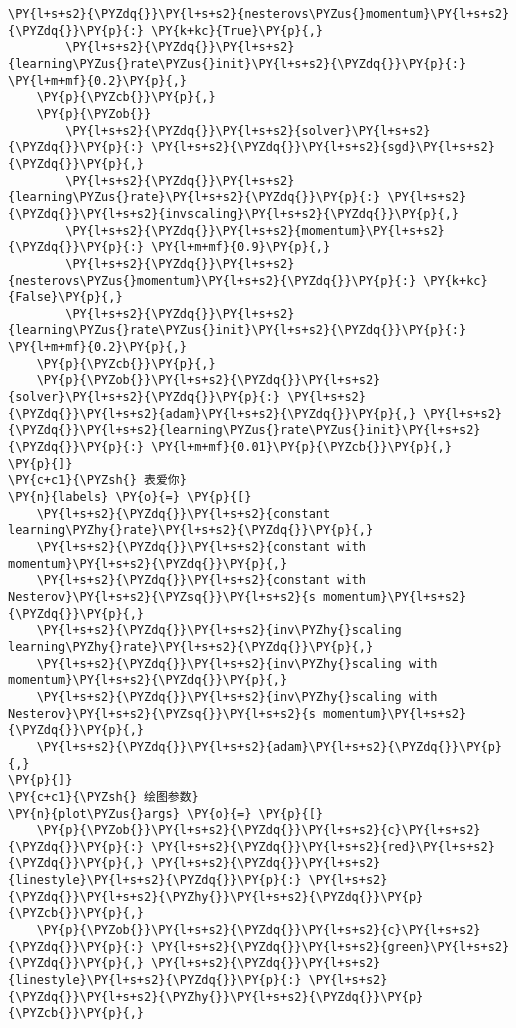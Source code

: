 \begin{Verbatim}[commandchars=\\\{\}]
        \PY{l+s+s2}{\PYZdq{}}\PY{l+s+s2}{nesterovs\PYZus{}momentum}\PY{l+s+s2}{\PYZdq{}}\PY{p}{:} \PY{k+kc}{True}\PY{p}{,}
        \PY{l+s+s2}{\PYZdq{}}\PY{l+s+s2}{learning\PYZus{}rate\PYZus{}init}\PY{l+s+s2}{\PYZdq{}}\PY{p}{:} \PY{l+m+mf}{0.2}\PY{p}{,}
    \PY{p}{\PYZcb{}}\PY{p}{,}
    \PY{p}{\PYZob{}}
        \PY{l+s+s2}{\PYZdq{}}\PY{l+s+s2}{solver}\PY{l+s+s2}{\PYZdq{}}\PY{p}{:} \PY{l+s+s2}{\PYZdq{}}\PY{l+s+s2}{sgd}\PY{l+s+s2}{\PYZdq{}}\PY{p}{,}
        \PY{l+s+s2}{\PYZdq{}}\PY{l+s+s2}{learning\PYZus{}rate}\PY{l+s+s2}{\PYZdq{}}\PY{p}{:} \PY{l+s+s2}{\PYZdq{}}\PY{l+s+s2}{invscaling}\PY{l+s+s2}{\PYZdq{}}\PY{p}{,}
        \PY{l+s+s2}{\PYZdq{}}\PY{l+s+s2}{momentum}\PY{l+s+s2}{\PYZdq{}}\PY{p}{:} \PY{l+m+mf}{0.9}\PY{p}{,}
        \PY{l+s+s2}{\PYZdq{}}\PY{l+s+s2}{nesterovs\PYZus{}momentum}\PY{l+s+s2}{\PYZdq{}}\PY{p}{:} \PY{k+kc}{False}\PY{p}{,}
        \PY{l+s+s2}{\PYZdq{}}\PY{l+s+s2}{learning\PYZus{}rate\PYZus{}init}\PY{l+s+s2}{\PYZdq{}}\PY{p}{:} \PY{l+m+mf}{0.2}\PY{p}{,}
    \PY{p}{\PYZcb{}}\PY{p}{,}
    \PY{p}{\PYZob{}}\PY{l+s+s2}{\PYZdq{}}\PY{l+s+s2}{solver}\PY{l+s+s2}{\PYZdq{}}\PY{p}{:} \PY{l+s+s2}{\PYZdq{}}\PY{l+s+s2}{adam}\PY{l+s+s2}{\PYZdq{}}\PY{p}{,} \PY{l+s+s2}{\PYZdq{}}\PY{l+s+s2}{learning\PYZus{}rate\PYZus{}init}\PY{l+s+s2}{\PYZdq{}}\PY{p}{:} \PY{l+m+mf}{0.01}\PY{p}{\PYZcb{}}\PY{p}{,}
\PY{p}{]}
\PY{c+c1}{\PYZsh{} 表爱你}
\PY{n}{labels} \PY{o}{=} \PY{p}{[}
    \PY{l+s+s2}{\PYZdq{}}\PY{l+s+s2}{constant learning\PYZhy{}rate}\PY{l+s+s2}{\PYZdq{}}\PY{p}{,}
    \PY{l+s+s2}{\PYZdq{}}\PY{l+s+s2}{constant with momentum}\PY{l+s+s2}{\PYZdq{}}\PY{p}{,}
    \PY{l+s+s2}{\PYZdq{}}\PY{l+s+s2}{constant with Nesterov}\PY{l+s+s2}{\PYZsq{}}\PY{l+s+s2}{s momentum}\PY{l+s+s2}{\PYZdq{}}\PY{p}{,}
    \PY{l+s+s2}{\PYZdq{}}\PY{l+s+s2}{inv\PYZhy{}scaling learning\PYZhy{}rate}\PY{l+s+s2}{\PYZdq{}}\PY{p}{,}
    \PY{l+s+s2}{\PYZdq{}}\PY{l+s+s2}{inv\PYZhy{}scaling with momentum}\PY{l+s+s2}{\PYZdq{}}\PY{p}{,}
    \PY{l+s+s2}{\PYZdq{}}\PY{l+s+s2}{inv\PYZhy{}scaling with Nesterov}\PY{l+s+s2}{\PYZsq{}}\PY{l+s+s2}{s momentum}\PY{l+s+s2}{\PYZdq{}}\PY{p}{,}
    \PY{l+s+s2}{\PYZdq{}}\PY{l+s+s2}{adam}\PY{l+s+s2}{\PYZdq{}}\PY{p}{,}
\PY{p}{]}
\PY{c+c1}{\PYZsh{} 绘图参数}
\PY{n}{plot\PYZus{}args} \PY{o}{=} \PY{p}{[}
    \PY{p}{\PYZob{}}\PY{l+s+s2}{\PYZdq{}}\PY{l+s+s2}{c}\PY{l+s+s2}{\PYZdq{}}\PY{p}{:} \PY{l+s+s2}{\PYZdq{}}\PY{l+s+s2}{red}\PY{l+s+s2}{\PYZdq{}}\PY{p}{,} \PY{l+s+s2}{\PYZdq{}}\PY{l+s+s2}{linestyle}\PY{l+s+s2}{\PYZdq{}}\PY{p}{:} \PY{l+s+s2}{\PYZdq{}}\PY{l+s+s2}{\PYZhy{}}\PY{l+s+s2}{\PYZdq{}}\PY{p}{\PYZcb{}}\PY{p}{,}
    \PY{p}{\PYZob{}}\PY{l+s+s2}{\PYZdq{}}\PY{l+s+s2}{c}\PY{l+s+s2}{\PYZdq{}}\PY{p}{:} \PY{l+s+s2}{\PYZdq{}}\PY{l+s+s2}{green}\PY{l+s+s2}{\PYZdq{}}\PY{p}{,} \PY{l+s+s2}{\PYZdq{}}\PY{l+s+s2}{linestyle}\PY{l+s+s2}{\PYZdq{}}\PY{p}{:} \PY{l+s+s2}{\PYZdq{}}\PY{l+s+s2}{\PYZhy{}}\PY{l+s+s2}{\PYZdq{}}\PY{p}{\PYZcb{}}\PY{p}{,}

\end{Verbatim}
